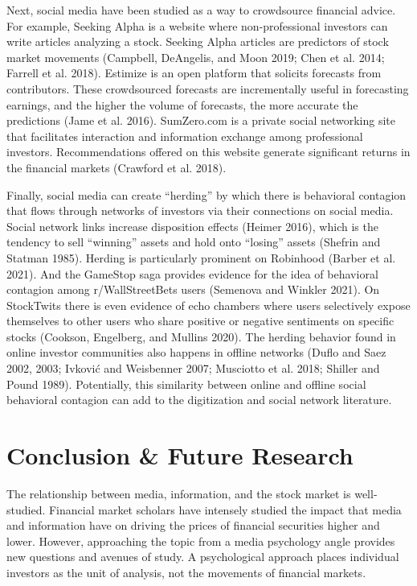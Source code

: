 \documentclass[12pt,]{article}
\begin{document}
Next, social media have been studied as a way to crowdsource financial
advice. For example, Seeking Alpha is a website where non-professional
investors can write articles analyzing a stock. Seeking Alpha articles
are predictors of stock market movements (Campbell, DeAngelis, and Moon
2019; Chen et al. 2014; Farrell et al. 2018). Estimize is an open
platform that solicits forecasts from contributors. These crowdsourced
forecasts are incrementally useful in forecasting earnings, and the
higher the volume of forecasts, the more accurate the predictions (Jame
et al. 2016). SumZero.com is a private social networking site that
facilitates interaction and information exchange among professional
investors. Recommendations offered on this website generate significant
returns in the financial markets (Crawford et al. 2018).

Finally, social media can create ``herding'' by which there is
behavioral contagion that flows through networks of investors via their
connections on social media. Social network links increase disposition
effects (Heimer 2016), which is the tendency to sell ``winning'' assets
and hold onto ``losing'' assets (Shefrin and Statman 1985). Herding is
particularly prominent on Robinhood (Barber et al. 2021). And the
GameStop saga provides evidence for the idea of behavioral contagion
among r/WallStreetBets users (Semenova and Winkler 2021). On StockTwits
there is even evidence of echo chambers where users selectively expose
themselves to other users who share positive or negative sentiments on
specific stocks (Cookson, Engelberg, and Mullins 2020). The herding
behavior found in online investor communities also happens in offline
networks (Duflo and Saez 2002, 2003; Ivković and Weisbenner 2007;
Musciotto et al. 2018; Shiller and Pound 1989). Potentially, this
similarity between online and offline social behavioral contagion can
add to the digitization and social network literature.

\hypertarget{conclusion-future-research}{%
\section{Conclusion \& Future
Research}\label{conclusion-future-research}}

The relationship between media, information, and the stock market is
well-studied. Financial market scholars have intensely studied the
impact that media and information have on driving the prices of
financial securities higher and lower. However, approaching the topic
from a media psychology angle provides new questions and avenues of
study. A psychological approach places individual investors as the unit
of analysis, not the movements of financial markets.
\end{document}
